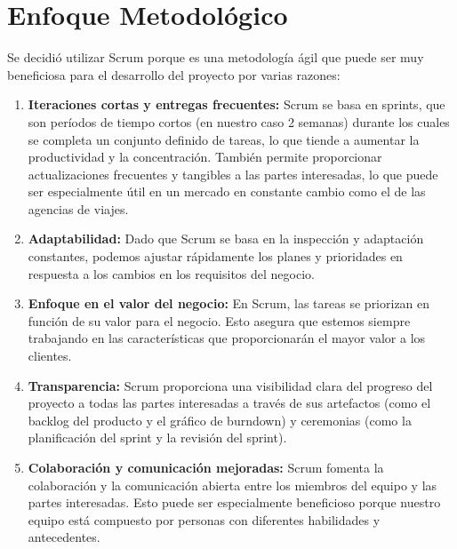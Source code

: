 \documentclass{article} %
\begin{document}
\section{Enfoque Metodológico}
Se decidió utilizar Scrum porque es una metodología ágil que puede ser muy beneficiosa para el
desarrollo del proyecto por varias razones:
\begin{enumerate}
    \item \textbf{Iteraciones cortas y entregas frecuentes:}  Scrum se basa en sprints, que son períodos de
tiempo cortos (en nuestro caso 2 semanas) durante los cuales se completa un conjunto
definido de tareas, lo que tiende a aumentar la productividad y la concentración. También
permite proporcionar actualizaciones frecuentes y tangibles a las partes interesadas, lo que
puede ser especialmente útil en un mercado en constante cambio como el de las agencias de
viajes.
\item \textbf{Adaptabilidad:} Dado que Scrum se basa en la inspección y adaptación constantes, podemos
ajustar rápidamente los planes y prioridades en respuesta a los cambios en los requisitos del
negocio.
\item \textbf{Enfoque en el valor del negocio:} En Scrum, las tareas se priorizan en función de su valor
para el negocio. Esto asegura que estemos siempre trabajando en las características que
proporcionarán el mayor valor a los clientes.
\item \textbf{Transparencia:} Scrum proporciona una visibilidad clara del progreso del proyecto a todas
las partes interesadas a través de sus artefactos (como el backlog del producto y el gráfico de
burndown) y ceremonias (como la planificación del sprint y la revisión del sprint).
\item \textbf{Colaboración y comunicación mejoradas:}  Scrum fomenta la colaboración y la
comunicación abierta entre los miembros del equipo y las partes interesadas. Esto puede ser
especialmente beneficioso porque nuestro equipo está compuesto por personas con
diferentes habilidades y antecedentes.
\end{enumerate}
\end{document}
